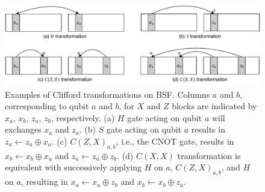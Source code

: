 \documentclass[conference,9pt]{IEEEtran}
\newcommand{\note}[1]{{\color{blue} #1}}
\newcommand{\CNOT}{\mathrm{CNOT}}
\begin{document}
    \begin{figure}[tbp]
        \centering
        \includegraphics[width=\columnwidth]{figures/cliff_trans.pdf}
        
        \caption{Examples of Clifford transformations on BSF. Columns $a$ and $b$, corresponding to qubit $a$ and $b$, for $X$ and $Z$ blocks are indicated by $x_a$, $x_b$, $z_a$, $z_b$, respectively. (a) $H$ gate acting on qubit $a$ will exchanges $x_a$ and $z_a$. (b) $S$ gate acting on qubit $a$ results in $z_a \gets z_a \oplus x_a$. (c) $C(Z,X)_{a,b}$, i.e., the $\CNOT$ gate, results in $x_b \gets x_b \oplus x_a$ and $z_a \gets z_a \oplus z_b$. (d) $C(X,X)$ transformation is equivalent with successively applying $H$ on $a$, $C(Z,X)_{a,b}$, and $H$ on $a$, resulting in $x_a \gets x_a \oplus z_b$ and $x_b \gets x_b \oplus z_a$.}
        \label{fig:clifford}
    \end{figure}

\end{document}
